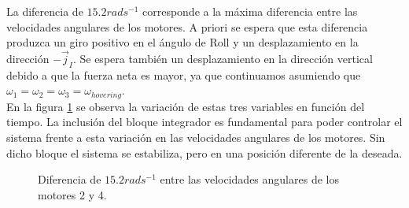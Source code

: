 \documentclass[main]{subfiles}
\begin{document}
La diferencia de $15.2rads^{-1}$ corresponde a la m\'axima diferencia entre las velocidades angulares de los motores. A priori se espera que esta diferencia produzca un giro positivo en el \'angulo de Roll y un desplazamiento en la direcci\'on $-\vec{j}_I$. Se espera tambi\'en un desplazamiento en la direcci\'on vertical debido a que la fuerza neta es mayor, ya que continuamos asumiendo que $\omega_1 = \omega_2 = \omega_3 =\omega_{hovering}$.\\

En la figura  \ref{fig:motor} se observa la variaci\'on de estas tres variables en funci\'on del tiempo. La inclusi\'on del bloque integrador es fundamental para poder controlar el sistema frente a esta variaci\'on en las velocidades angulares de los motores. Sin dicho bloque el sistema se estabiliza, pero en una posici\'on diferente de la deseada.\\

\begin{figure}
  \centering
 
  \caption{Diferencia de $15.2 rad s^{-1}$ entre las velocidades angulares de los motores 2 y 4.}
  \label{fig:motor}
\end{figure}
\end{document}
